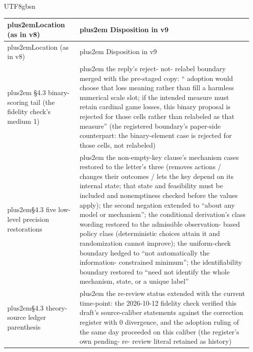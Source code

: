 \documentclass[11pt,letterpaper]{article}
\newcommand{\RaggedRight}{\rightskip=0pt plus2em\relax}
\begin{document}
\begin{CJK}{UTF8}{gbsn}
{\small\linespread{0.92}\selectfont\begin{longtable}{>{\RaggedRight\arraybackslash}p{6.85cm} >{\RaggedRight\arraybackslash}p{6.85cm}}
\toprule
Location (as in v8) & Disposition in v9 \\
\midrule
\endfirsthead
\toprule
Location (as in v8) & Disposition in v9 \\
\midrule
\endhead
\endfoot
\bottomrule
\endlastfoot
\S{}4.3 binary-scoring tail (the fidelity check's medium 1) & the reply's reject-\penalty-100 not-\penalty-100 relabel boundary merged with the pre-staged copy: ``\textemdash{} adoption would choose that loss meaning rather than fill a harmless numerical scale slot; if the intended measure must retain cardinal game losses, this binary proposal is rejected for those cells rather than relabeled as that measure'' (the registered boundary's paper-side counterpart: the binary-element case is rejected for those cells, not relabeled) \\
\S{}4.3 five low-level precision restorations & the non-empty-key clause's mechanism cases restored to the letter's three (removes actions / changes their outcomes / lets the key depend on its internal state; that state and feasibility must be included and nonemptiness checked before the values apply); the second negation extended to ``about any model or mechanism''; the conditional derivation's class wording restored to the admissible observation-\penalty-100 based policy class (deterministic choices attain it and randomization cannot improve); the uniform-check boundary hedged to ``not automatically the information-\penalty-100 constrained minimum''; the identifiability boundary restored to ``need not identify the whole mechanism, state, or a unique label'' \\
\S{}4.3 theory-source ledger parenthesis & the re-review status extended with the current time-point: the 2026-10-12 fidelity check verified this draft's source-caliber statements against the correction register with 0 divergence, and the adoption ruling of the same day proceeded on this caliber (the register's own pending-\penalty-100 re-\penalty-100 review literal retained as history) \\

\end{longtable}}
\end{CJK}
\end{document}
